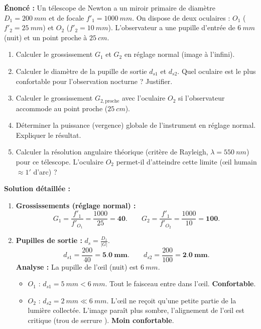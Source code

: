 \documentclass[11pt]{article}
\begin{document}
\begin{exoresolu}
\textbf{Énoncé :} Un télescope de Newton a un miroir primaire de diamètre $D_1 = \SI{200}{mm}$ et de focale $f'_1 = \SI{1000}{mm}$. On dispose de deux oculaires : $O_1$ ($f'_2 = \SI{25}{mm}$) et $O_2$ ($f'_2 = \SI{10}{mm}$). L'observateur a une pupille d'entrée de $\SI{6}{mm}$ (nuit) et un point proche à $\SI{25}{cm}$.
\begin{enumerate}
    \item Calculer le grossissement $G_1$ et $G_2$ en réglage normal (image à l'infini).
    \item Calculer le diamètre de la pupille de sortie $d_{s1}$ et $d_{s2}$. Quel oculaire est le plus confortable pour l'observation nocturne ? Justifier.
    \item Calculer le grossissement $G_{2,\text{proche}}$ avec l'oculaire $O_2$ si l'observateur accommode au point proche ($\SI{25}{cm}$).
    \item Déterminer la puissance (vergence) globale de l'instrument en réglage normal. Expliquer le résultat.
    \item Calculer la résolution angulaire théorique (critère de Rayleigh, $\lambda = \SI{550}{nm}$) pour ce télescope. L'oculaire $O_2$ permet-il d'atteindre cette limite (œil humain $\approx 1'$ d'arc) ?
\end{enumerate}
\tcblower
\textbf{Solution détaillée :}
\begin{enumerate}
    \item \textbf{Grossissements (réglage normal) :}
    \[
    G_1 = \frac{f'_1}{f'_{O_1}} = \frac{1000}{25} = \mathbf{40}. \qquad
    G_2 = \frac{f'_1}{f'_{O_2}} = \frac{1000}{10} = \mathbf{100}.
    \]
    \item \textbf{Pupilles de sortie :} $d_s = \frac{D_1}{|G|}$.
    \[
    d_{s1} = \frac{200}{40} = \mathbf{\SI{5,0}{mm}}. \qquad
    d_{s2} = \frac{200}{100} = \mathbf{\SI{2,0}{mm}}.
    \]
    \textbf{Analyse :} La pupille de l'œil (nuit) est $\SI{6}{mm}$.
    \begin{itemize}
        \item $O_1$ : $d_{s1}=\SI{5}{mm} < \SI{6}{mm}$. Tout le faisceau entre dans l'œil. \textbf{Confortable}.
        \item $O_2$ : $d_{s2}=\SI{2}{mm} \ll \SI{6}{mm}$. L'œil ne reçoit qu'une petite partie de la lumière collectée. L'image paraît plus sombre, l'alignement de l'œil est critique (\og trou de serrure \fg). \textbf{Moin confortable}.
    \end{itemize}

\end{enumerate}
\end{exoresolu}
\end{document}
